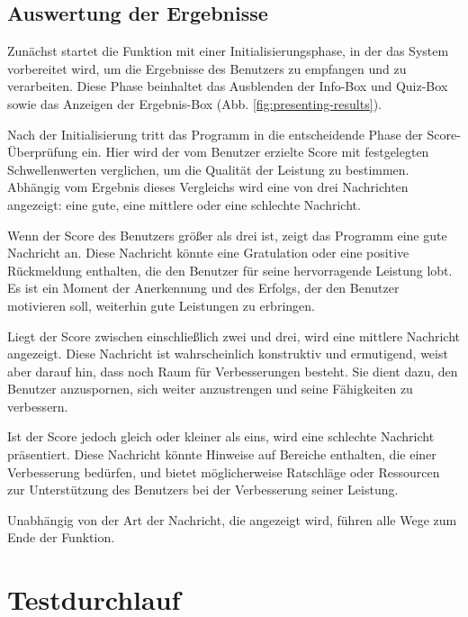 \documentclass[10pt, fleqn]{scrartcl}
\begin{document}
\subsection{Auswertung der Ergebnisse}

Zunächst startet die Funktion mit einer Initialisierungsphase, in der das System vorbereitet wird, um die Ergebnisse des Benutzers zu empfangen und zu verarbeiten. Diese Phase beinhaltet das Ausblenden der Info-Box und Quiz-Box sowie das Anzeigen der Ergebnis-Box (Abb. \ref{fig:presenting-results}).

Nach der Initialisierung tritt das Programm in die entscheidende Phase der Score-Überprüfung ein. Hier wird der vom Benutzer erzielte Score mit festgelegten Schwellenwerten verglichen, um die Qualität der Leistung zu bestimmen. Abhängig vom Ergebnis dieses Vergleichs wird eine von drei Nachrichten angezeigt: eine gute, eine mittlere oder eine schlechte Nachricht.

Wenn der Score des Benutzers größer als drei ist, zeigt das Programm eine gute Nachricht an. Diese Nachricht könnte eine Gratulation oder eine positive Rückmeldung enthalten, die den Benutzer für seine hervorragende Leistung lobt. Es ist ein Moment der Anerkennung und des Erfolgs, der den Benutzer motivieren soll, weiterhin gute Leistungen zu erbringen.

Liegt der Score zwischen einschließlich zwei und drei, wird eine mittlere Nachricht angezeigt. Diese Nachricht ist wahrscheinlich konstruktiv und ermutigend, weist aber darauf hin, dass noch Raum für Verbesserungen besteht. Sie dient dazu, den Benutzer anzuspornen, sich weiter anzustrengen und seine Fähigkeiten zu verbessern.

Ist der Score jedoch gleich oder kleiner als eins, wird eine schlechte Nachricht präsentiert. Diese Nachricht könnte Hinweise auf Bereiche enthalten, die einer Verbesserung bedürfen, und bietet möglicherweise Ratschläge oder Ressourcen zur Unterstützung des Benutzers bei der Verbesserung seiner Leistung.

Unabhängig von der Art der Nachricht, die angezeigt wird, führen alle Wege zum Ende der Funktion.


\newpage

\section{Testdurchlauf}
\end{document}
